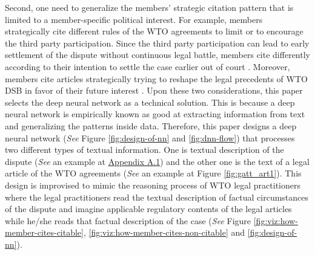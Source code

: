 Second, one need to generalize the members' strategic citation pattern that is limited to a member-specific political interest.
For example, members strategically cite different rules of the WTO agreements to limit or to encourage
the third party participation. Since the third party participation
can lead to early settlement of the dispute without continuous
legal battle, members cite differently according to their intention to
settle the case earlier out of court \citep{who_gets}. Moreover, members cite articles strategically trying to reshape the legal precedents of WTO DSB
in favor of their future interest \citep{pelc, latent}.
Upon these two considerations, this paper selects the deep neural network as a technical solution. %
This is because a deep neural network is empirically known as good at extracting information from text and generalizing the patterns inside data.
Therefore, this paper designs a deep neural network (\textit{See} Figure \ref{fig:design-of-nn} and \ref{fig:dnn-flow}) that
processes two different types of textual information.
One is textual description of the dispute (\textit{See} an example at \hyperref[sub:factual-aspect-example]{Appendix A.1}) and
the other one is the text of a legal article of the WTO agreements (\textit{See} an example at Figure \ref{fig:gatt_art1}).
This design is improvised to mimic
the reasoning process of WTO legal practitioners
where the legal practitioners read
the textual description of
factual circumstances of the dispute and imagine applicable regulatory contents of
the legal articles while he/she reads that factual description of the case (\textit{See} Figure \ref{fig:viz:how-member-cites-citable}, \ref{fig:viz:how-member-cites-non-citable} and \ref{fig:design-of-nn}).
